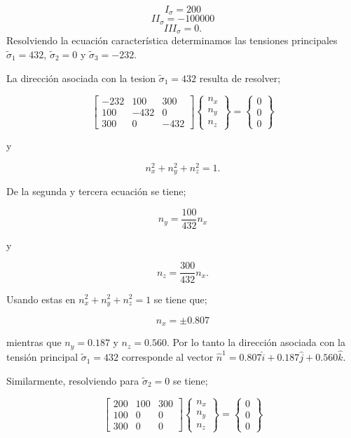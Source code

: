 \documentclass[../notas medios.tex]{subfiles}
\begin{document}
\[{I_\sigma } = 200\]
\[I{I_\sigma } =  - 100000\]
\[II{I_\sigma } = 0.\]
%
Resolviendo la ecuación característica determinamos las tensiones principales ${{\tilde \sigma }_1} = 432$, ${{\tilde \sigma }_2} = 0$ y ${{\tilde \sigma }_3} =  - 232$.

La dirección asociada con la tesion ${{\tilde \sigma }_1} = 432$ resulta de resolver;

\[\left[ {\begin{array}{*{20}{c}}
{ - 232}&{100}&{300}\\
{100}&{ - 432}&0\\
{300}&0&{ - 432}
\end{array}} \right]\left\{ {\begin{array}{*{20}{c}}
{{n_x}}\\
{{n_y}}\\
{{n_z}}
\end{array}} \right\} = \left\{ {\begin{array}{*{20}{c}}
0\\
0\\
0
\end{array}} \right\}\]

y

\[n_x^2 + n_y^2 + n_z^2 = 1.\]

De la segunda y tercera ecuación se tiene;

\[{n_y} = \frac{{100}}{{432}}{n_x}\]

y

\[{n_z} = \frac{{300}}{{432}}{n_x}.\]

Usando estas en $n_x^2 + n_y^2 + n_z^2 = 1$ se tiene que;

\[{n_x} =  \pm 0.807\]

mientras que ${n_y} = 0.187$ y ${n_z} = 0.560$. Por lo tanto la dirección asociada con la tensión principal ${{\tilde \sigma }_1} = 432$ corresponde al vector ${{\hat n}^1} = 0.807\hat i + 0.187\hat j + 0.560\hat k$.

Similarmente, resolviendo para ${{\tilde \sigma }_2} = 0$ se tiene;


\[\left[ {\begin{array}{*{20}{c}}
{ 200}&{100}&{300}\\
{100}&{ 0}&0\\
{300}&0&{0}
\end{array}} \right]\left\{ {\begin{array}{*{20}{c}}
{{n_x}}\\
{{n_y}}\\
{{n_z}}
\end{array}} \right\} = \left\{ {\begin{array}{*{20}{c}}
0\\
0\\
0
\end{array}} \right\}\]
\end{document}
